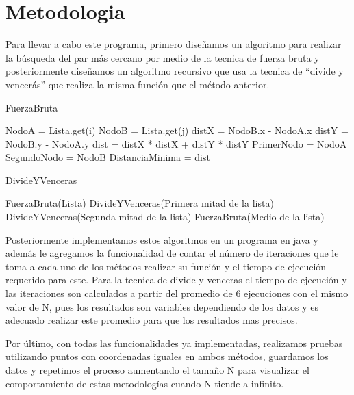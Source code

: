 \section{Metodologia}
Para llevar a cabo este programa, primero diseñamos un algoritmo para realizar la búsqueda del par más cercano por medio de la tecnica de fuerza bruta y posteriormente diseñamos un algoritmo recursivo que usa la tecnica de “divide y vencerás” que realiza la misma función que el método anterior.
\begin{algorithm}[H]	
\caption{FuerzaBruta}	
\begin{algorithmic}
\STATE NodoA = Lista.get(i)
\STATE NodoB = Lista.get(j)
\STATE distX = NodoB.x - NodoA.x
\STATE distY = NodoB.y - NodoA.y
\STATE dist = distX * distX + distY * distY
\STATE PrimerNodo = NodoA
\STATE SegundoNodo = NodoB
\STATE DistanciaMinima = dist
\ENDIF
\ENDFOR
\ENDFOR
\end{algorithmic}
\label{algo:factorial}	
\end{algorithm}

\begin{algorithm}[H]	
\caption{DivideYVenceras}	
\begin{algorithmic}
\STATE FuerzaBruta(Lista)
\ELSE
\STATE DivideYVenceras(Primera mitad de la lista)
\STATE DivideYVenceras(Segunda mitad de la lista)
\STATE FuerzaBruta(Medio de la lista)
\ENDIF
\end{algorithmic}
\label{algo:factorial}	
\end{algorithm}

Posteriormente implementamos estos algoritmos en un programa en java y además le agregamos la funcionalidad de contar el número de iteraciones que le toma a cada uno de los métodos realizar su función y el tiempo de ejecución requerido para este. Para la tecnica de divide y venceras el tiempo de ejecución y las iteraciones son calculados a partir del promedio de  6 ejecuciones con el mismo valor de N, pues los resultados son variables dependiendo de los datos y es adecuado realizar este promedio para que los resultados mas precisos.

Por último, con todas las funcionalidades ya implementadas, realizamos pruebas utilizando puntos con coordenadas iguales en ambos métodos, guardamos los datos y repetimos el proceso aumentando el tamaño N para visualizar el comportamiento de estas metodologías cuando N tiende a infinito.